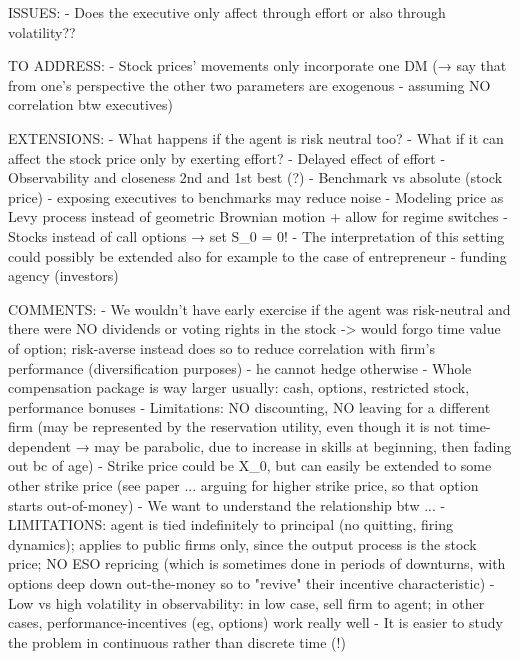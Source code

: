 ISSUES:
- Does the executive only affect through effort or also through volatility??






TO ADDRESS:
- Stock prices' movements only incorporate one DM (→ say that from one's perspective the other two parameters are exogenous - assuming NO correlation btw executives) 


EXTENSIONS:
- What happens if the agent is risk neutral too?
- What if it can affect the stock price only by exerting effort?
- Delayed effect of effort
- Observability and closeness 2nd and 1st best (?)
- Benchmark vs absolute (stock price) - exposing executives to benchmarks may reduce noise
- Modeling price as Levy process instead of geometric Brownian motion + allow for regime switches
- Stocks instead of call options → set S_0 = 0!
- The interpretation of this setting could possibly be extended also for example to the case of entrepreneur - funding agency (investors)


COMMENTS:
- We wouldn't have early exercise if the agent was risk-neutral and there were NO dividends or voting rights in the stock -> would forgo time value of option; risk-averse instead does so to reduce correlation with firm's performance (diversification purposes) - he cannot hedge otherwise
- Whole compensation package is way larger usually: cash, options, restricted stock, performance bonuses
- Limitations: NO discounting, NO leaving for a different firm (may be represented by the reservation utility, even though it is not time-dependent → may be parabolic, due to increase in skills at beginning, then fading out bc of age)
- Strike price could be X_0, but can easily be extended to some other strike price (see paper ... arguing for higher strike price, so that option starts out-of-money)
- We want to understand the relationship btw ...
- LIMITATIONS: agent is tied indefinitely to principal (no quitting, firing dynamics); applies to public firms only, since the output process is the stock price; NO ESO repricing (which is sometimes done in periods of downturns, with options deep down out-the-money so to "revive" their incentive characteristic)
- Low vs high volatility in observability: in low case, sell firm to agent; in other cases, performance-incentives (eg, options) work really well
- It is easier to study the problem in continuous rather than discrete time (!)